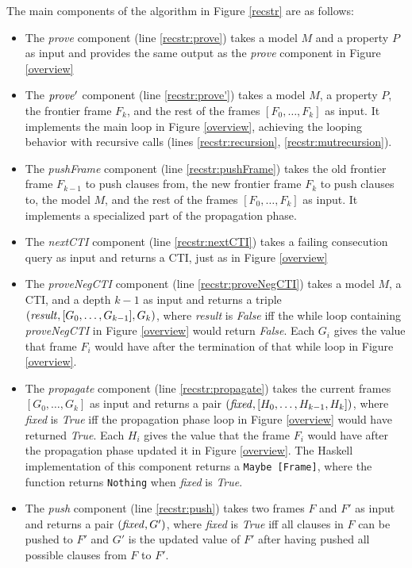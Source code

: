 \documentclass[12pt,a4paper,twoside,openright]{report}
\begin{document}
{The main components of the algorithm in Figure \ref{recstr} are as follows:
\begin{itemize}
\item The {\it prove} component (line \ref{recstr:prove})
takes a model $M$ and a property $P$ as input
 and provides the same output as the \emph{prove} component in Figure \ref{overview}
\item The ${\it prove'}$ component (line \ref{recstr:prove'})
takes a model $M$, a property $P$,
the frontier frame $F_k$, and the rest of the frames $[F_0,\ldots,F_k]$ as input. It
implements the main loop in Figure \ref{overview}, achieving the looping behavior with
recursive calls (lines \ref{recstr:recursion}, \ref{recstr:mutrecursion}).
\item The {\it pushFrame} component (line \ref{recstr:pushFrame}) takes the old frontier frame
$F_{k - 1}$ to push clauses from, the new frontier frame $F_k$ to push clauses to,
the model $M$, and the rest of the frames $[F_0, \ldots, F_k]$ as input.
It implements a specialized part of the propagation phase.
\item The {\it nextCTI} component (line \ref{recstr:nextCTI})
takes a failing consecution query as input and returns
a CTI, just as in Figure \ref{overview}
\item The {\it proveNegCTI} component (line \ref{recstr:proveNegCTI})
takes a model $M$, a CTI, and a depth $k - 1$ as input and
returns a triple $({\it result}, [G_0, \ldots, G_{k - 1}], G_k)$, where {\it result}
is {\it False} iff the while loop containing {\it proveNegCTI} in Figure \ref{overview}
would return {\it False}.
Each $G_i$ gives the value that frame $F_i$ would have after the termination of
that while loop in Figure \ref{overview}.
\item The {\it propagate} component (line \ref{recstr:propagate})
takes the current frames $[G_0, \ldots, G_k]$ as input and
returns a pair $({\it fixed}, [H_0, \ldots, H_{k-1}, H_k])$, where {\it fixed} is {\it True}
iff the propagation phase loop in Figure \ref{overview} would have returned {\it True}.
Each $H_i$ gives the value that the frame $F_i$ would have after the propagation
phase updated it in Figure \ref{overview}. The Haskell implementation of this component
returns a \verb,Maybe [Frame],, where the function returns \verb,Nothing,
when {\it fixed} is {\it True}.
\item The {\it push} component (line \ref{recstr:push})
takes two frames $F$ and $F'$ as input and returns a
pair $({\it fixed}, G')$, where {\it fixed} is {\it True} iff all clauses in $F$ can
be pushed to $F'$ and $G'$ is the updated value of $F'$ after having pushed all possible
clauses from $F$ to $F'$.
\end{itemize}

}
\end{document}
